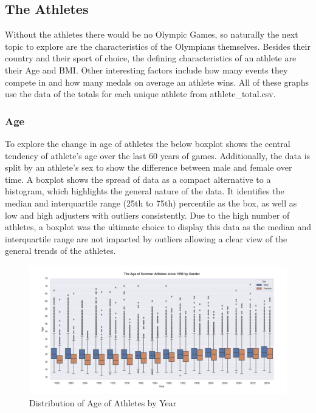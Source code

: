 \documentclass[a4 paper, 12pt]{article}
\begin{document}
    \subsection{The Athletes}
    Without the athletes there would be no Olympic Games, so naturally the next topic to explore are the characteristics of the Olympians themselves. Besides their country and their sport of choice, the defining characteristics of an athlete are their Age and BMI. Other interesting factors include how many events they compete in and how many medals on average an athlete wins. All of these graphs use the data of the totals for each unique athlete from athlete\_total.csv.
    
        \subsubsection{Age}
        To explore the change in age of athletes the below boxplot shows the central tendency of athlete's age over the last 60 years of games. Additionally, the data is split by an athlete's sex to show the difference between male and female over time. A boxplot shows the spread of data as a compact alternative to a histogram, which highlights the general nature of the data. It identifies the median and interquartile range (25th to 75th) percentile as the box, as well as low and high adjusters with outliers consistently. Due to the high number of athletes, a boxplot was the ultimate choice to display this data as the median and interquartile range are not impacted by outliers allowing a clear view of the general trends of the athletes. 
        \begin{figure} [H]
            \centering
            \includegraphics[width=\textwidth, frame]
                {./images/graph/athlete_age_boxplot.png}      
                \caption{Distribution of Age of Athletes by Year} 
        \end{figure}
         
\end{document}
